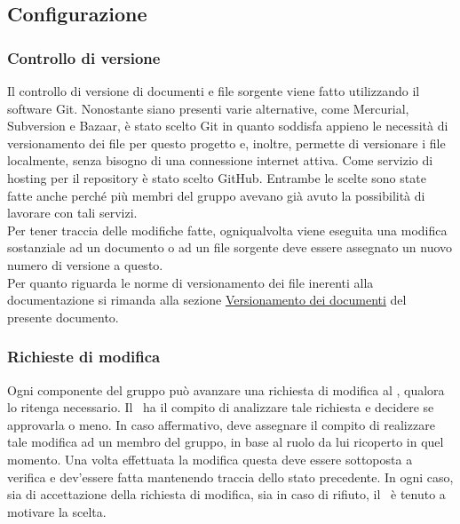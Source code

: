 \subsection{Configurazione}
	\subsubsection{Controllo di versione}
	Il controllo di versione di documenti e file sorgente viene fatto utilizzando il software Git. Nonostante siano presenti varie alternative, come Mercurial, Subversion e Bazaar, è stato scelto Git in quanto soddisfa appieno le necessità di versionamento dei file per questo progetto e, inoltre, permette di versionare i file localmente, senza bisogno di una connessione internet attiva. Come servizio di hosting per il repository è stato scelto GitHub. Entrambe le scelte sono state fatte anche perché più membri del gruppo avevano già avuto la possibilità di lavorare con tali servizi. \\ Per tener traccia delle modifiche fatte, ogniqualvolta viene eseguita una modifica sostanziale ad un documento o ad un file sorgente deve essere assegnato un nuovo numero di versione a questo. \\ Per quanto riguarda le norme di versionamento dei file inerenti alla documentazione si rimanda alla sezione \hyperref[sec:Versionamento dei documenti]{Versionamento dei documenti} del presente documento.
	\subsubsection{Richieste di modifica}
	Ogni componente del gruppo può avanzare una richiesta di modifica al \responsabilediprogetto, qualora lo ritenga necessario. Il \responsabilediprogetto\ ha il compito di analizzare tale richiesta e decidere se approvarla o meno. In caso affermativo, deve assegnare il compito di realizzare tale modifica ad un membro del gruppo, in base al ruolo da lui ricoperto in quel momento. Una volta effettuata la modifica questa deve essere sottoposta a verifica e dev'essere fatta mantenendo traccia dello stato precedente. In ogni caso, sia di accettazione della richiesta di modifica, sia in caso di rifiuto, il \responsabilediprogetto\ è tenuto a motivare la scelta.
